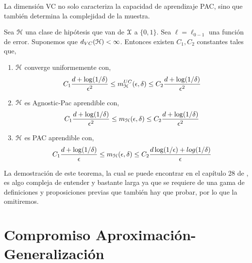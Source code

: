     
    La dimensión VC no solo caracteriza la capacidad de aprendizaje PAC, sino que también determina la complejidad de la muestra. \\
    
    \begin{teorema}
    Sea $\mathcal{H}$ una clase de hipótesis que van de $\mathcal{X}$ a $\{0,1\}$. Sea $\ell = \ell_{0-1}$ una función de error. Suponemos que $d_{VC}(\mathcal{H}) < \infty$. Entonces existen $C_1,C_2$ constantes tales que,
    
    \begin{enumerate}
        \item $\mathcal{H}$ converge uniformemente con,
        \begin{equation}
            C_1\frac{d + \log(1/\delta)}{\epsilon^2} \leq m_{\mathcal{H}}^{UC}(\epsilon,\delta) \leq C_2 \frac{d + \log(1/\delta)}{\epsilon^2}
        \end{equation}
        \item $\mathcal{H}$ es Agnostic-Pac aprendible con,
        \begin{equation}
            C_1\frac{d + \log(1/\delta)}{\epsilon^2} \leq m_{\mathcal{H}}(\epsilon,\delta) \leq C_2 \frac{d + \log(1/\delta)}{\epsilon^2}
        \end{equation}
        \item $\mathcal{H}$ es PAC aprendible con,
        \begin{equation}
            C_1\frac{d + \log(1/\delta)}{\epsilon} \leq m_{\mathcal{H}}(\epsilon,\delta) \leq C_2 \frac{d\log(1/\epsilon) + log(1/\delta)}{\epsilon}
        \end{equation}
    \end{enumerate}
    \end{teorema}

    La demostración de este teorema, la cual se puede encontrar en el capítulo 28 de \cite{UML}, es algo compleja de entender y bastante larga ya que se requiere de una gama de definiciones y proposiciones previas que también hay que probar, por lo que la omitiremos. \\


\section{Compromiso Aproximación-Generalización}

